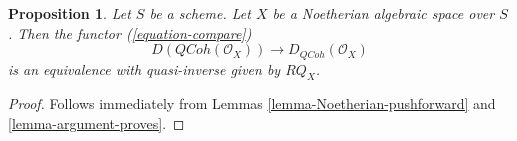\documentclass[10pt,a4paper]{amsart}
\theoremstyle{plain}
\newtheorem{proposition}[subsection]{Proposition}
\theoremstyle{definition}
\theoremstyle{remark}
\numberwithin{equation}{subsection}
\def\QCoh{\mathit{QCoh}}
\begin{document}
\begin{proposition}
\label{proposition-Noetherian}
Let $S$ be a scheme. Let $X$ be a Noetherian algebraic space over $S$.
Then the functor (\ref{equation-compare})
$$
D(\QCoh(\mathcal{O}_X))
\longrightarrow
D_\QCoh(\mathcal{O}_X)
$$
is an equivalence with quasi-inverse given by $RQ_X$.
\end{proposition}

\begin{proof}
Follows immediately from Lemmas \ref{lemma-Noetherian-pushforward} and
\ref{lemma-argument-proves}.
\end{proof}
\end{document}
